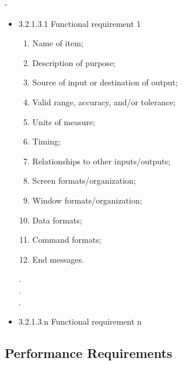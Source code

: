 -\documentclass[compsoc,draftclsnofoot,onecolumn,10pt]{IEEEtran}
\begin{document}
	\begin{itemize}
		\item[]{3.2.1.3.1 Functional requirement 1}~\\
		\begin{enumerate}
			\item Name of item;
			\item Description of purpose;
			\item Source of input or destination of output;
			\item Valid range, accuracy, and/or tolerance;
			\item Units of measure;
			\item Timing;
			\item Relationships to other inputs/outputs;
			\item Screen formats/organization;
			\item Window formats/organization;
			\item Data formats;
			\item Command formats;
			\item End messages.
		\end{enumerate}
			.\\
			.\\
			.\\
		\item[]{3.2.1.3.n Functional requirement n}~\\
	\end{itemize}


\subsection{Performance Requirements}
%
%
%
%
%
%
%
%
%
\end{document}
